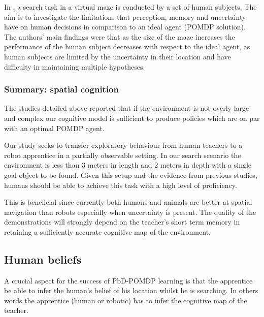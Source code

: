 In \cite{stankiewicz2006lost}, a search task in a virtual maze is conducted by a set of human subjects.  The aim 
is to investigate the limitations that perception, memory and uncertainty have on human decisions in comparison 
to an ideal agent (POMDP solution). The authors' main findings were that as the size of the maze increases the
performance of the human subject decreases with respect to the ideal agent, as human subjects are limited by the 
uncertainty in their location and have difficulty in maintaining multiple hypotheses.

\subsubsection{Summary: spatial cognition}


The studies detailed above reported that if the environment is not overly large and complex our cognitive model is sufficient 
to produce policies which are on par with an optimal POMDP agent. 

Our study seeks to transfer exploratory behaviour from human teachers to a robot apprentice in a partially observable setting. 
In our search scenario the environment is less than 3 meters in length and 2 meters in depth with a single goal object to be found. 
Given this setup and the evidence from previous studies, humans should be able to achieve this task with a high level of proficiency. 

This is beneficial since currently both humans and animals are better at spatial navigation than robots \cite{stankiewicz2006lost} 
especially when uncertainty is present. The quality of the demonstrations will strongly depend on the teacher's short term memory 
in retaining a sufficiently accurate cognitive map of the environment. 


\subsection{Human beliefs}


A crucial aspect for the success of PbD-POMDP learning is that the apprentice be able to infer 
the human's belief of his location whilst he is searching. In others words the apprentice
(human or robotic) has to infer the cognitive map of the teacher. 


